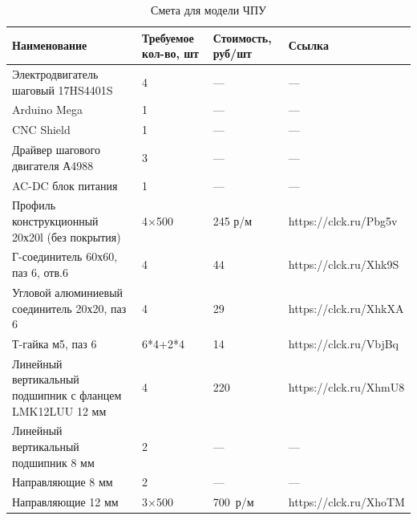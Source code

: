 \documentclass[a4paper,12pt]{article}
\theoremstyle{plain}                          %
\theoremstyle{definition}                     %
\theoremstyle{remark}                         %
\begin{document}
\begin{table}[!ht]
    \centering
    \caption{Смета для модели ЧПУ}
    \begin{tabular}{|p{7cm}|p{2cm}|p{2cm}|p{5cm}|}
        \hline
        Наименование                                             & Требуемое кол-во, шт & Стоимость, руб/шт & Ссылка                \\ \hline
        Электродвигатель шаговый 17HS4401S                       & 4                    & ---               & ---                   \\ \hline
        Arduino Mega                                             & 1                    & ---               & ---                   \\ \hline
        CNC Shield                                               & 1                    & ---               & ---                   \\ \hline
        Драйвер шагового двигателя А4988                         & 3                    & ---               & ---                   \\ \hline
        AC-DC блок питания                                       & 1                    & ---               & ---                   \\ \hline
        Профиль конструкционный 20х20l (без покрытия)            & 4×500                & 245 р/м           & https://clck.ru/Pbg5v \\ \hline
        Г-соединитель 60х60, паз 6, отв.6                        & 4                    & 44                & https://clck.ru/Xhk9S \\ \hline
        Угловой алюминиевый соединитель 20х20, паз 6             & 4                    & 29                & https://clck.ru/XhkXA \\ \hline
        Т-гайка м5, паз 6                                        & 6*4+2*4              & 14                & https://clck.ru/VbjBq \\ \hline
        Линейный вертикальный подшипник с фланцем LMK12LUU 12 мм & 4                    & 220               & https://clck.ru/XhmU8 \\ \hline
        Линейный вертикальный подшипник 8 мм                     & 2                    & ---               & ---                   \\ \hline
        Направляющие 8 мм                                        & 2                    & ---               & ---                   \\ \hline
        Направляющие 12 мм                                       & 3×500                & 700 р/м           & https://clck.ru/XhoTM \\ \hline

\end{tabular}
\end{table}
\end{document}
